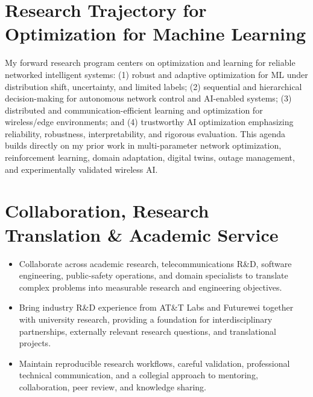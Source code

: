 \documentclass[9pt,letterpaper]{extarticle}
\begin{document}
\section{Research Trajectory for Optimization for Machine Learning}
My forward research program centers on optimization and learning for reliable networked intelligent systems: (1) robust and adaptive optimization for ML under distribution shift, uncertainty, and limited labels; (2) sequential and hierarchical decision-making for autonomous network control and AI-enabled systems; (3) distributed and communication-efficient learning and optimization for wireless/edge environments; and (4) trustworthy AI optimization emphasizing reliability, robustness, interpretability, and rigorous evaluation. This agenda builds directly on my prior work in multi-parameter network optimization, reinforcement learning, domain adaptation, digital twins, outage management, and experimentally validated wireless AI.

\section{Collaboration, Research Translation \& Academic Service}
\begin{itemize}
\item Collaborate across academic research, telecommunications R\&D, software engineering, public-safety operations, and domain specialists to translate complex problems into measurable research and engineering objectives.
\item Bring industry R\&D experience from AT\&T Labs and Futurewei together with university research, providing a foundation for interdisciplinary partnerships, externally relevant research questions, and translational projects.
\item Maintain reproducible research workflows, careful validation, professional technical communication, and a collegial approach to mentoring, collaboration, peer review, and knowledge sharing.
\end{itemize}
\end{document}
